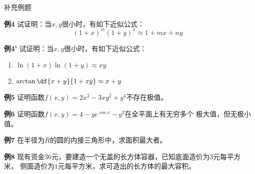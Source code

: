 \begin{frame}{补充例题}
	\linespread{1.2}
	\begin{exampleblock}{{\bf 例4}\hfill}
		试证明：当$x,y$很小时，有如下近似公式：
		$$(1+x)^m(1+y)^n\approx 1+mx+ny$$
	\end{exampleblock}
	\bigskip\pause
	\begin{exampleblock}{{\bf 例4'}\hfill}
		试证明：当$x,y$很小时，有如下近似公式：
		\begin{enumerate}
		  \item $\ln(1+x)\ln(1+y)\approx xy$
		  \item $\arctan\df{x+y}{1+xy}\approx x+y$
		\end{enumerate}
	\end{exampleblock}
\end{frame}

\begin{frame}
	\linespread{1.2}
	\begin{exampleblock}{{\bf 例5}\hfill}
		证明函数$f(x,y)=2x^2-3xy^2+y^4$不存在极值。
	\end{exampleblock}
	\pause 
	\bigskip
	\begin{exampleblock}{{\bf 例6}\hfill}
		证明函数$f(x,y)=4-ye^{\cos x}-y^2$在全平面上有无穷多个
		极大值，但无极小值。
	\end{exampleblock}
\end{frame}

\begin{frame}
	\linespread{1.2}
	\begin{exampleblock}{{\bf 例7}\hfill}
		在半径为$R$的圆的内接三角形中，求面积最大者。
	\end{exampleblock}
	\pause 
	\bigskip
	\begin{exampleblock}{{\bf 例8}\hfill}
		现有资金$36$元，要建造一个无盖的长方体容器，已知底面造价为$3$元每平方米，
		侧面造价为$1$元每平方米，求可造出的长方体的最大容积。
	\end{exampleblock}
\end{frame}


